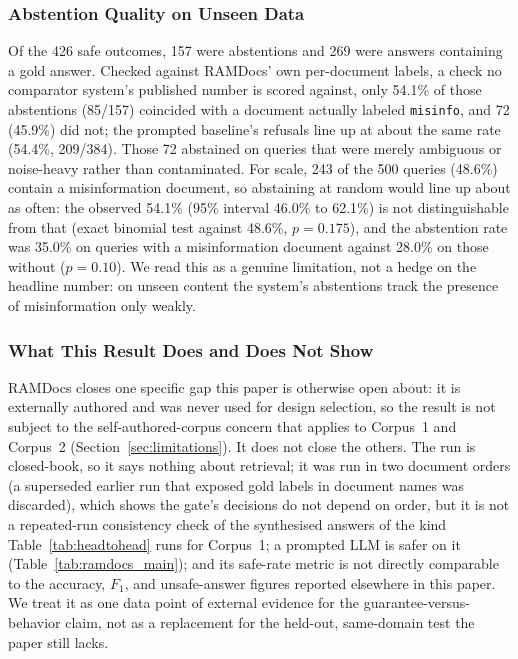 \documentclass[conference]{IEEEtran}
\begin{document}
\subsubsection{Abstention Quality on Unseen Data}
Of the 426 safe outcomes, 157 were abstentions and 269 were answers
containing a gold answer. Checked against RAMDocs' own per-document labels,
a check no comparator system's published number is scored against, only
54.1\% of those abstentions (85/157) coincided with a document actually
labeled \texttt{misinfo}, and 72 (45.9\%) did not; the prompted
baseline's refusals line up at about the same rate (54.4\%, 209/384). Those 72 abstained on queries that were merely ambiguous or noise-heavy
rather than contaminated. For scale, 243 of the 500 queries (48.6\%) contain a
misinformation document, so abstaining at random would line up about as
often: the observed 54.1\% (95\% interval 46.0\% to 62.1\%) is not
distinguishable from that (exact binomial test against 48.6\%,
$p=0.175$), and the abstention rate was 35.0\% on
queries with a misinformation document against 28.0\% on those without
($p=0.10$). We read this as a genuine limitation, not a hedge on the
headline number: on unseen content the system's abstentions track the
presence of misinformation only weakly.

\subsubsection{What This Result Does and Does Not Show}
RAMDocs closes one specific gap this paper is otherwise open about: it is
externally authored and was never used for design selection, so the result
is not subject to the self-authored-corpus concern that applies to Corpus~1
and Corpus~2 (Section~\ref{sec:limitations}). It does not close the others.
The run is closed-book, so it says nothing about retrieval; it was run in
two document orders (a superseded earlier run that exposed gold labels in
document names was discarded), which shows the gate's decisions do not
depend on order, but it is not a repeated-run consistency check of the
synthesised answers of the kind Table~\ref{tab:headtohead} runs for
Corpus~1; a prompted LLM is safer on it
(Table~\ref{tab:ramdocs_main}); and its safe-rate metric is not directly
comparable to the accuracy, $F_1$, and unsafe-answer figures reported
elsewhere in this paper. We treat it as one data point of external evidence
for the guarantee-versus-behavior claim, not as a replacement for the
held-out, same-domain test the paper still lacks.
\end{document}
